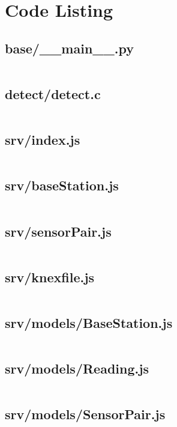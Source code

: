 \chapter{Code Listing}

\section{base/\_\_main\_\_.py}
\label{code:base-main}
\inputminted{python}{../base/__main__.py}

\section{detect/detect.c}
\label{code:detect}
\inputminted{C}{../detect/detect.c}


\section{srv/index.js}
\label{code:srv-index}
\inputminted{javascript}{../srv/index.js}

\section{srv/baseStation.js}
\label{code:srv-basestation-api}
\inputminted{javascript}{../srv/baseStation.js}

\section{srv/sensorPair.js}
\label{code:srv-sensorpair-api}
\inputminted{javascript}{../srv/sensorPair.js}

\section{srv/knexfile.js}
\label{code:srv-knexfile}
\inputminted{javascript}{../srv/knexfile.js}

\section{srv/models/BaseStation.js}
\label{code:srv-basestation-model}
\inputminted{javascript}{../srv/models/BaseStation.js}

\section{srv/models/Reading.js}
\label{code:srv-reading-model}
\inputminted{javascript}{../srv/models/Reading.js}

\section{srv/models/SensorPair.js}
\label{code:srv-sensorpair-model}
\inputminted{javascript}{../srv/models/SensorPair.js}